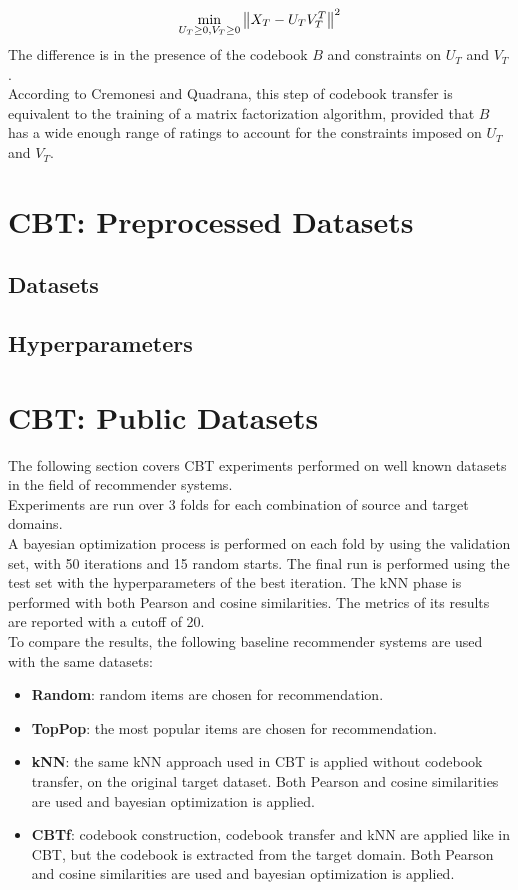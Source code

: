 \begin{equation*}
\min_{U_T \geq 0, V_T \geq 0} \left\lVert X_T - U_T V_T^T\right\rVert^2
\end{equation*}
The difference is in the presence of the codebook $B$ and constraints on $U_T$ and $V_T$.\\
According to Cremonesi and Quadrana, this step of codebook transfer is equivalent to the training of a matrix factorization algorithm, provided that $B$ has a wide enough range of ratings to account for the constraints imposed on $U_T$ and $V_T$.



\section{CBT: Preprocessed Datasets}


\subsection{Datasets}


\subsection{Hyperparameters}



\section{CBT: Public Datasets}

The following section covers CBT experiments performed on well known datasets in the field of recommender systems.\\
Experiments are run over 3 folds for each combination of source and target domains.\\
A bayesian optimization process is performed on each fold by using the validation set, with 50 iterations and 15 random starts. The final run is performed using the test set with the hyperparameters of the best iteration. The kNN phase is performed with both Pearson and cosine similarities. The metrics of its results are reported with a cutoff of 20.\\
To compare the results, the following baseline recommender systems are used with the same datasets:
\begin{itemize}
\item \textbf{Random}: random items are chosen for recommendation.
\item \textbf{TopPop}: the most popular items are chosen for recommendation.
\item \textbf{kNN}: the same kNN approach used in CBT is applied without codebook transfer, on the original target dataset. Both Pearson and cosine similarities are used and bayesian optimization is applied.
\item \textbf{CBTf}: codebook construction, codebook transfer and kNN are applied like in CBT, but the codebook is extracted from the target domain. Both Pearson and cosine similarities are used and bayesian optimization is applied.
\end{itemize}


